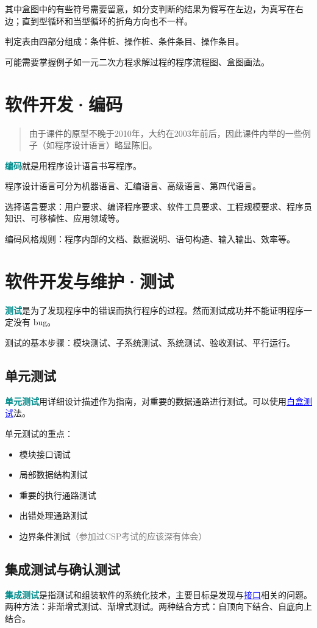 \documentclass[UTF8]{ctexart}
\newcommand\Concept[1]{\textcolor{darkcyan}{\textbf{#1}}\index{#1}} %
\newcommand\Point[1]{\textcolor{blue}{\uline{#1}}} %
\newenvironment{trivial}[0]{ %
    \begin{quote}\color{gray}\small
}{
    \end{quote}
}
\begin{document}
其中盒图中的有些符号需要留意，如分支判断的结果为假写在左边，为真写在右边；直到型循环和当型循环的折角方向也不一样。

判定表由四部分组成：条件桩、操作桩、条件条目、操作条目。

可能需要掌握例子如一元二次方程求解过程的程序流程图、盒图画法。

\section{软件开发·编码}
\begin{trivial}
    由于课件的原型不晚于2010年，大约在2003年前后，因此课件内举的一些例子（如程序设计语言）略显陈旧。
\end{trivial}

\Concept{编码}就是用程序设计语言书写程序。

程序设计语言可分为机器语言、汇编语言、高级语言、第四代语言。

选择语言要求：用户要求、编译程序要求、软件工具要求、工程规模要求、程序员知识、可移植性、应用领域等。

编码风格规则：程序内部的文档、数据说明、语句构造、输入输出、效率等。

\section{软件开发与维护·测试}
\Concept{测试}是为了发现程序中的错误而执行程序的过程。然而测试成功并不能证明程序一定没有 bug。

测试的基本步骤：模块测试、子系统测试、系统测试、验收测试、平行运行。

\subsection{单元测试}
\Concept{单元测试}用详细设计描述作为指南，对重要的数据通路进行测试。可以使用\Point{白盒测试}法。

单元测试的重点：
\begin{itemize}
    \item 模块接口调试
    \item 局部数据结构测试
    \item 重要的执行通路测试
    \item 出错处理通路测试
    \item 边界条件测试\textcolor{gray}{（参加过CSP考试的应该深有体会）}
\end{itemize}

\subsection{集成测试与确认测试}
\Concept{集成测试}是指测试和组装软件的系统化技术，主要目标是发现与\Point{接口}相关的问题。两种方法：非渐增式测试、渐增式测试。两种结合方式：自顶向下结合、自底向上结合。
\end{document}
